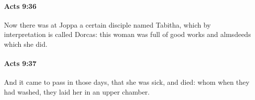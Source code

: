 		\paragraph{Acts 9:36} %
			\label{ACTS-9-36}

			Now there was at Joppa a certain disciple named Tabitha, which by interpretation is called Dorcas: this woman was full of good works and almsdeeds which she did.

			\begin{framed}
			\scriptsize
				\begin{compactdesc}
					\item[SBLG] 
				\end{compactdesc}
			\end{framed}

		\paragraph{Acts 9:37} %
			\label{ACTS-9-37}

			And it came to pass in those days, that she was sick, and died: whom when they had washed, they laid her in an upper chamber.

